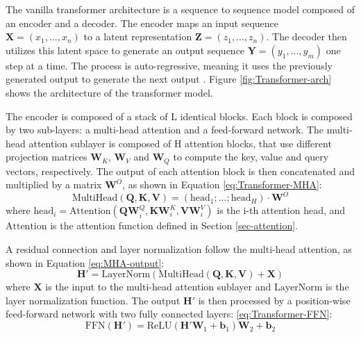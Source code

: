 The vanilla transformer architecture is a sequence to sequence model composed of an encoder and a decoder. The encoder maps an input sequence $\boldsymbol{X} = (x_1,...,x_n)$ to a latent representation $\boldsymbol{Z} = (z_1,...,z_n)$. The decoder then utilizes this latent space to generate an output sequence $\boldsymbol{Y} = (y_1,...,y_m)$ one step at a time. The process is auto-regressive, meaning it uses the previously generated output to generate the next output \cite{vaswani2023attentionneed}. Figure \ref{fig:Transformer-arch} shows the architecture of the transformer model.

The encoder is composed of a stack of L identical blocks. Each block is composed by two sub-layers: a multi-head attention and a feed-forward network. The multi-head attention sublayer is composed of H attention blocks, that use different projection matrices $\boldsymbol{W}_K$, $\boldsymbol{W}_V$ and $\boldsymbol{W}_Q$ to compute the key, value and query vectors, respectively. The output of each attention block is then concatenated and multiplied by a matrix $\boldsymbol{W}^O$, as shown in Equation \ref{eq:Transformer-MHA}:
\begin{equation}
    \text{MultiHead}(\boldsymbol{Q}, \boldsymbol{K}, \boldsymbol{V}) = \left(\text{head}_1;...;\text{head}_H\right) \cdot \boldsymbol{W}^O 
    \label{eq:Transformer-MHA}
\end{equation}
where $\text{head}_i = \text{Attention}(\boldsymbol{Q}\boldsymbol{W}_{i}^{Q}, \boldsymbol{K}\boldsymbol{W}_{i}^{K}, \boldsymbol{V}\boldsymbol{W}_{i}^{V})$ is the i-th attention head, and $\text{Attention}$ is the attention function defined in Section \ref{sec-attention}. 

A residual connection and layer normalization follow the multi-head attention, as shown in Equation \ref{eq:MHA-output}:
\begin{equation}
    \boldsymbol{H}' = \text{LayerNorm}(\text{MultiHead}(\boldsymbol{Q}, \boldsymbol{K}, \boldsymbol{V}) + \boldsymbol{X})
    \label{eq:MHA-output}
\end{equation}
where $\boldsymbol{X}$ is the input to the multi-head attention sublayer and $\text{LayerNorm}$ is the layer normalization function. The output $\boldsymbol{H}'$ is then processed by a position-wise feed-forward network with two fully connected layers: \ref{eq:Transformer-FFN}:
\begin{equation}
    \text{FFN}(\boldsymbol{H}') = \text{ReLU}(\boldsymbol{H}'\boldsymbol{W}_1 + \boldsymbol{b}_1)\boldsymbol{W}_2 + \boldsymbol{b}_2
    \label{eq:Transformer-FFN}
\end{equation}

